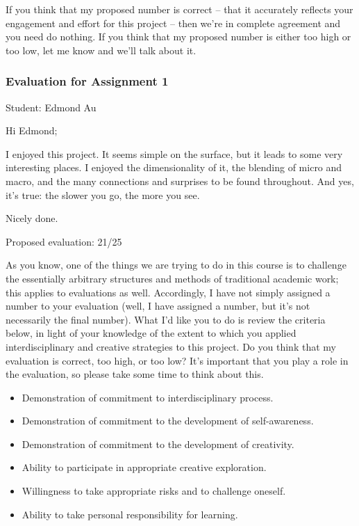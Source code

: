 \documentclass[letterpaper,10pt,DIV=9,headsepline]{scrreprt}
\begin{document}
If you think that my proposed number is correct -- that it accurately
reflects your engagement and effort for this project -- then we're in
complete agreement and you need do nothing. If you think that my
proposed number is either too high or too low, let me know and we'll
talk about it.

\newpage

\subsubsection{Evaluation for Assignment 1}

Student: Edmond Au

\bigskip
Hi Edmond;

I enjoyed this project. It seems simple on the surface, but it leads
to some very interesting places. I enjoyed the dimensionality of it,
the blending of micro and macro, and the many connections and
surprises to be found throughout. And yes, it's true: the slower you go, the more you see.

Nicely done.

\bigskip
Proposed evaluation: 21/25

\bigskip
As you know, one of the things we are trying to do in this course is
to challenge the essentially arbitrary structures and methods of
traditional academic work; this applies to evaluations as well.
Accordingly, I have not simply assigned a number to your evaluation
(well, I have assigned a number, but it's not necessarily the final
number). What I'd like you to do is review the criteria below, in
light of your knowledge of the extent to which you applied
interdisciplinary and creative strategies to this project. Do you
think that my evaluation is correct, too high, or too low? It's
important that you play a role in the evaluation, so please take some
time to think about this.

\begin{itemize}
\item Demonstration of commitment to interdisciplinary process.
\item Demonstration of commitment to the development of self-awareness.
\item Demonstration of commitment to the development of creativity.
\item Ability to participate in appropriate creative exploration.
\item Willingness to take appropriate risks and to challenge oneself.
\item Ability to take personal responsibility for learning.
\end{itemize}
\end{document}
